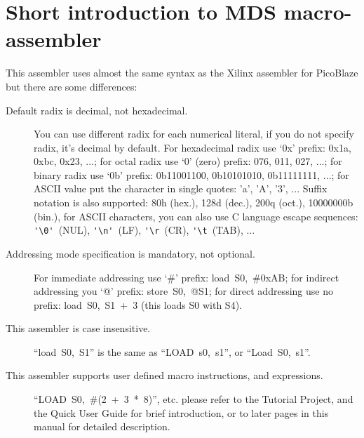 \section{Short introduction to MDS macro-assembler}
    This assembler uses almost the same syntax as the Xilinx assembler for PicoBlaze but there are some differences:
    \begin{description}
        \item[Default radix is decimal, not hexadecimal.]
            You can use different radix for each numerical literal, if you do not specify radix, it's decimal by
            default. For hexadecimal radix use `0x' prefix: 0x1a, 0xbc, 0x23, ...; for octal radix use `0' (zero)
            prefix: 076, 011, 027, ...; for binary radix use `0b' prefix: 0b11001100, 0b10101010, 0b11111111, ...; for
            ASCII value put the character in single quotes: 'a', 'A', '3', ... Suffix notation is also supported: 80h
            (hex.), 128d (dec.), 200q (oct.), 10000000b (bin.), for ASCII characters, you can also use C language escape
            sequences: \verb"'\0'"~(NUL), \verb"'\n'"~(LF), \verb"'\r"~(CR), \verb"'\t"~(TAB), ...
        \item[Addressing mode specification is mandatory, not optional.]
            For immediate addressing use `\#' prefix: load~S0,~\#0xAB; for indirect addressing you `@' prefix:
            store~S0,~@S1; for direct addressing use no prefix: load~S0,~S1~+~3 (this loads S0 with S4).
        \item[This assembler is case insensitive.]
            ``load~S0,~S1'' is the same as ``LOAD~s0,~s1'', or ``Load~S0,~s1''.
        \item[This assembler supports user defined macro instructions, and expressions.]
            ``LOAD~S0,~\#(2~+~3~*~8)'', etc. please refer to the Tutorial Project, and the Quick User Guide for brief
            introduction, or to later pages in this manual for detailed description.
    \end{description}
